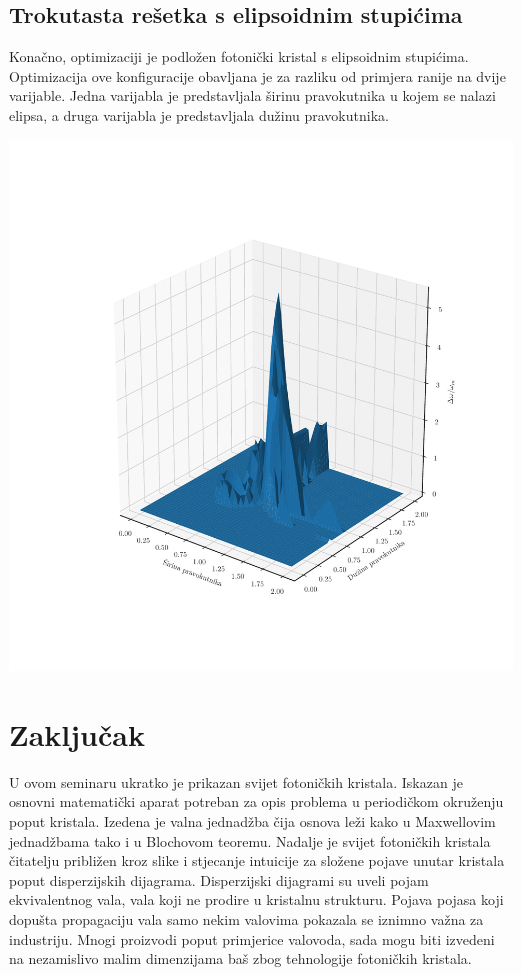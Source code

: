 \documentclass[utf8, seminar, numeric]{fer}
\begin{document}
\FloatBarrier

\section{Trokutasta rešetka s elipsoidnim stupićima}

Konačno, optimizaciji je podložen fotonički kristal s elipsoidnim stupićima. Optimizacija
ove konfiguracije obavljana je za razliku od primjera ranije na dvije varijable.
Jedna varijabla je predstavljala širinu pravokutnika u kojem se nalazi elipsa, a
druga varijabla je predstavljala dužinu pravokutnika.

\includegraphics[width=0.8\linewidth]{./images/pdf/ellipsoid_optimization.pdf}


\chapter{Zaključak}

U ovom seminaru ukratko je prikazan svijet fotoničkih kristala. Iskazan je osnovni
matematički aparat potreban za opis problema u periodičkom okruženju poput
kristala. Izedena je valna jednadžba čija osnova leži kako u Maxwellovim
jednadžbama tako i u Blochovom teoremu. Nadalje je svijet fotoničkih kristala
čitatelju približen kroz slike i stjecanje intuicije za složene pojave unutar
kristala poput disperzijskih dijagrama. Disperzijski dijagrami su uveli pojam
ekvivalentnog vala, vala koji ne prodire u kristalnu strukturu. Pojava pojasa
koji dopušta propagaciju vala samo nekim valovima pokazala se iznimno važna
za industriju. Mnogi proizvodi poput primjerice valovoda, sada mogu biti
izvedeni na nezamislivo malim dimenzijama baš zbog tehnologije fotoničkih
kristala.
\end{document}

